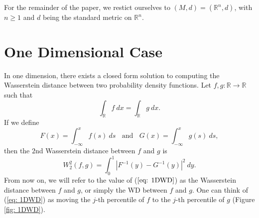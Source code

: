 \documentclass[10pt]{article}
\begin{document}
\noindent For the remainder of the paper, we restict ourselves to $(M,d) = (\mathbb{R}^n, d)$, with $n \geq 1$ and $d$ being the standard metric on $\mathbb{R}^n$. 

\section{One Dimensional Case} \label{sec: OneD}
In one dimension, there exists a closed form solution to computing the Wasserstein distance between two probability density functions. Let $f, g: \mathbb{R} \rightarrow \mathbb{R}$ such that
\begin{equation}
\int_{\mathbb{R}} f \ dx = \int_{\mathbb{R}} g \ dx.
\end{equation}
If we define
\begin{equation}
F(x) = \int_{- \infty}^x f(s) \ ds \ \ \ \ \text{and} \ \ \ \ G(x) = \int_{- \infty}^x g(s) \ ds,
\end{equation}
then the $2$nd Wasserstein distance between $f$ and $g$ is
\begin{equation}
W_2^2(f, g) = {\int_{0}^1 |F^{-1}(y) - G^{-1}(y)|^2 \ dy}.
\label{eq: 1DWD}
\end{equation}
From now on, we will refer to the value of ($\ref{eq: 1DWD}$) as the Wasserstein distance between $f$ and $g$, or simply the WD between $f$ and $g$.
One can think of (\ref{eq: 1DWD}) as moving the $j$-th percentile of $f$ to the $j$-th percentile of $g$ (Figure \ref{fig: 1DWD}).
\end{document}
